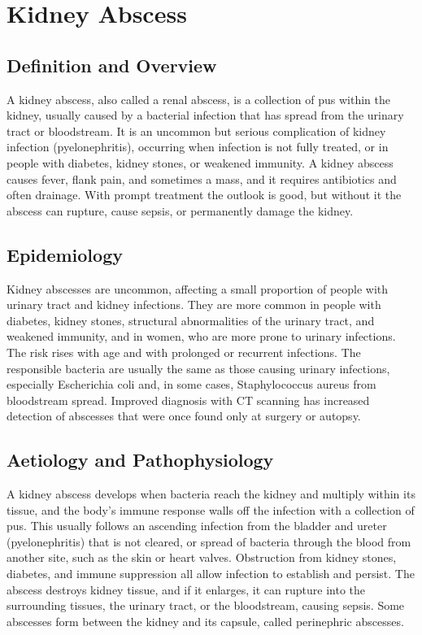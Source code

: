 \chapter{Kidney Abscess}

\section*{Definition and Overview}
A kidney abscess, also called a renal abscess, is a collection of pus within the kidney, usually caused by a bacterial infection that has spread from the urinary tract or bloodstream. It is an uncommon but serious complication of kidney infection (pyelonephritis), occurring when infection is not fully treated, or in people with diabetes, kidney stones, or weakened immunity. A kidney abscess causes fever, flank pain, and sometimes a mass, and it requires antibiotics and often drainage. With prompt treatment the outlook is good, but without it the abscess can rupture, cause sepsis, or permanently damage the kidney.

\section*{Epidemiology}
Kidney abscesses are uncommon, affecting a small proportion of people with urinary tract and kidney infections. They are more common in people with diabetes, kidney stones, structural abnormalities of the urinary tract, and weakened immunity, and in women, who are more prone to urinary infections. The risk rises with age and with prolonged or recurrent infections. The responsible bacteria are usually the same as those causing urinary infections, especially Escherichia coli and, in some cases, Staphylococcus aureus from bloodstream spread. Improved diagnosis with CT scanning has increased detection of abscesses that were once found only at surgery or autopsy.

\section*{Aetiology and Pathophysiology}
A kidney abscess develops when bacteria reach the kidney and multiply within its tissue, and the body's immune response walls off the infection with a collection of pus. This usually follows an ascending infection from the bladder and ureter (pyelonephritis) that is not cleared, or spread of bacteria through the blood from another site, such as the skin or heart valves. Obstruction from kidney stones, diabetes, and immune suppression all allow infection to establish and persist. The abscess destroys kidney tissue, and if it enlarges, it can rupture into the surrounding tissues, the urinary tract, or the bloodstream, causing sepsis. Some abscesses form between the kidney and its capsule, called perinephric abscesses.

